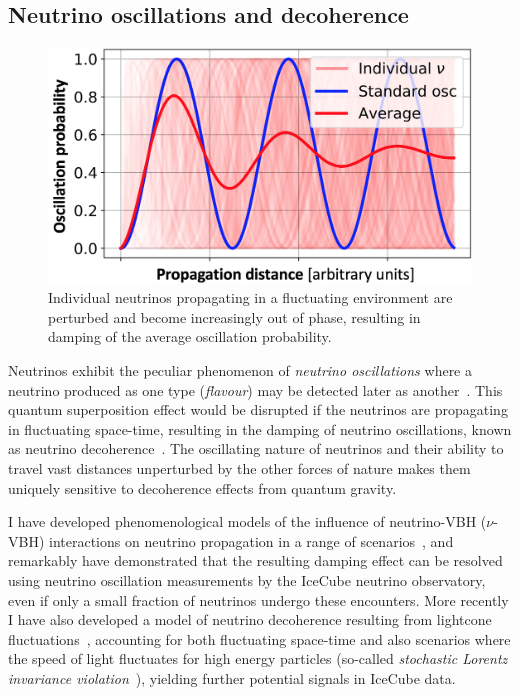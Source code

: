 \documentclass[a4paper,11pt]{article}
\begin{document}
\subsection{Neutrino oscillations and decoherence}

\begin{figure} %
    \centering
		\vspace{-7pt}
		\includegraphics[width=1.\linewidth]{images/decoherence.png}
		\caption{Individual neutrinos propagating in a fluctuating environment are perturbed and become increasingly out of phase, resulting in damping of the average oscillation probability.}
		\vspace{-5pt}
		\label{fig:decoherence}
\end{figure}

Neutrinos exhibit the peculiar phenomenon of \textit{neutrino oscillations} where a neutrino produced as one type (\textit{flavour}) may be detected later as another~\cite{Fukuda:1998mi, Ahmad:2001an,Ahmad:2002jz}. This quantum superposition effect would be disrupted if the neutrinos are propagating in fluctuating space-time, resulting in the damping of neutrino oscillations, known as neutrino decoherence~\cite{Benatti_2000, PhysRevLett.85.1166}. The oscillating nature of neutrinos and their ability to travel vast distances unperturbed by the other forces of nature makes them uniquely sensitive to decoherence effects from quantum gravity.

I have developed phenomenological models of the influence of neutrino-VBH ($\nu$-VBH) interactions on neutrino propagation in a range of scenarios~\cite{PhysRevD.102.115003}, and remarkably have demonstrated that the resulting damping effect can be resolved using neutrino oscillation measurements by the IceCube neutrino observatory, even if only a small fraction of neutrinos undergo these encounters. More recently I have also developed a model of neutrino decoherence resulting from lightcone fluctuations~\cite{2103.15313}, accounting for both fluctuating space-time and also scenarios where the speed of light fluctuates for high energy particles (so-called \textit{stochastic Lorentz invariance violation}~\cite{Vasileiou2015}), yielding further potential signals in IceCube data. 
\end{document}
